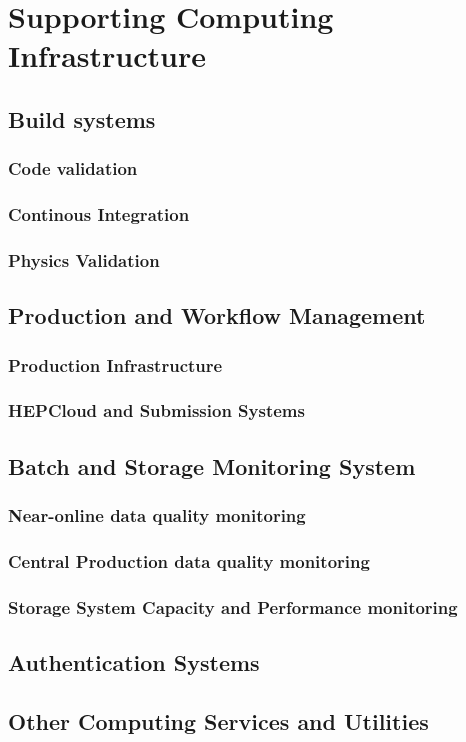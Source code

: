 %
\chapter{Supporting Computing Infrastructure} 
\section{Build systems}
\subsection{Code validation}
\subsection{Continous Integration}
\subsection{Physics Validation}
\section{Production and Workflow Management}
\subsection{Production Infrastructure}
\subsection{HEPCloud and Submission Systems}
\section{Batch and Storage Monitoring System}
\subsection{Near-online data quality monitoring}
\subsection{Central Production data quality monitoring}
\subsection{Storage System Capacity and Performance monitoring}
\section{Authentication Systems}
\section{Other Computing Services and Utilities}
